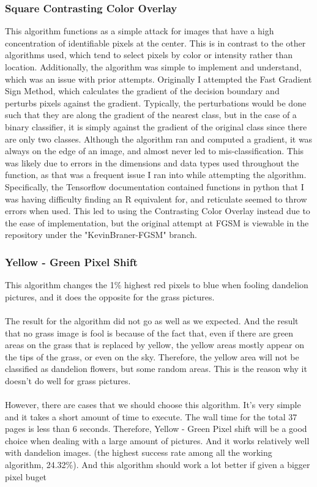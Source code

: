 \documentclass{article}
\begin{document}
\subsubsection{Square Contrasting Color Overlay}
This algorithm functions as a simple attack for images that have a high concentration of identifiable pixels at the center. This is in contrast to the other algorithms used, which tend to select pixels by color or intensity rather than location. Additionally, the algorithm was simple to implement and understand, which was an issue with prior attempts. Originally I attempted the Fast Gradient Sign Method, which calculates the gradient of the decision boundary and perturbs pixels against the gradient. Typically, the perturbations would be done such that they are along the gradient of the nearest class, but in the case of a binary classifier, it is simply against the gradient of the original class since there are only two classes. Although the algorithm ran and computed a gradient, it was always on the edge of an image, and almost never led to mis-classification. This was likely due to errors in the dimensions and data types used throughout the function, as that was a frequent issue I ran into while attempting the algorithm. Specifically, the Tensorflow documentation contained functions in python that I was having difficulty finding an R equivalent for, and reticulate seemed to throw errors when used. This led to using the Contrasting Color Overlay instead due to the ease of implementation, but the original attempt at FGSM is viewable in the repository under the "KevinBraner-FGSM" branch.


\subsubsection{Yellow - Green Pixel Shift}
This algorithm changes the 1\% highest red pixels to blue when fooling dandelion pictures, and it does the opposite for the grass pictures. 
\\
\\
The result for the algorithm did not go as well as we expected. And the result that no grass image is fool is because of the fact that, even if there are green areas on the grass that is replaced by yellow, the yellow areas mostly appear on the tips of the grass, or even on the sky. Therefore, the yellow area will not be classified as dandelion flowers, but some random areas. This is the reason why it doesn't do well for grass pictures. 
\\
\\
However, there are cases that we should choose this algorithm. It's very simple and it takes a short amount of time to execute. The wall time for the total 37 pages is less than 6 seconds. Therefore, Yellow - Green Pixel shift will be a good choice when dealing with a large amount of pictures. And it works relatively well with dandelion images. (the highest success rate among all the working algorithm, 24.32\%). And this algorithm should work a lot better if given a bigger pixel buget
\end{document}
